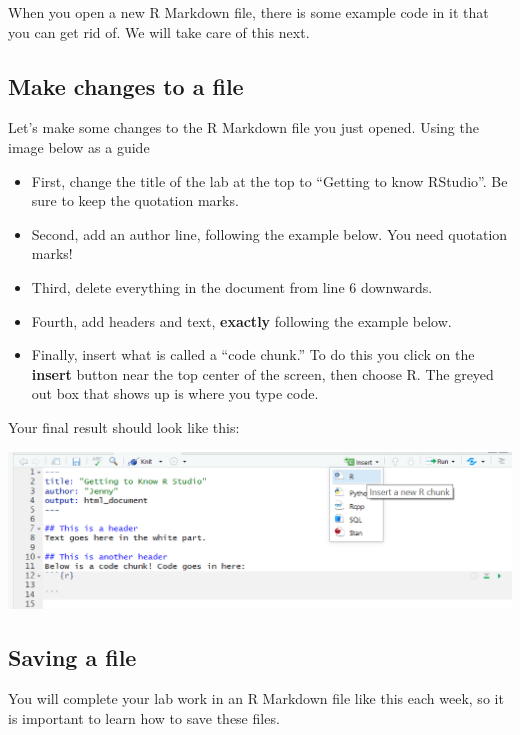 \documentclass[
]{article}
\providecommand{\tightlist}{%
  \setlength{\itemsep}{0pt}\setlength{\parskip}{0pt}}
\begin{document}
When you open a new R Markdown file, there is some example code in it
that you can get rid of. We will take care of this next.

\hypertarget{make-changes-to-a-file}{%
\subsection{Make changes to a file}\label{make-changes-to-a-file}}

Let's make some changes to the R Markdown file you just opened. Using
the image below as a guide

\begin{itemize}
\tightlist
\item
  First, change the title of the lab at the top to ``Getting to know
  RStudio''. Be sure to keep the quotation marks.
\item
  Second, add an author line, following the example below. You need
  quotation marks!
\item
  Third, delete everything in the document from line 6 downwards.
\item
  Fourth, add headers and text, \textbf{exactly} following the example
  below.
\item
  Finally, insert what is called a ``code chunk.'' To do this you click
  on the \textbf{insert} button near the top center of the screen, then
  choose R. The greyed out box that shows up is where you type code.
\end{itemize}

Your final result should look like this:

\includegraphics[width=1\textwidth,height=\textheight]{figures/make.changes.png}

\hypertarget{saving-a-file}{%
\subsection{Saving a file}\label{saving-a-file}}

You will complete your lab work in an R Markdown file like this each
week, so it is important to learn how to save these files.
\end{document}
